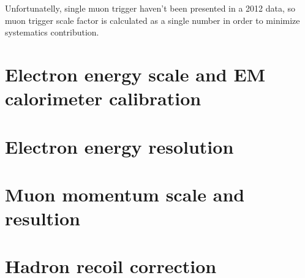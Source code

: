Unfortunatelly, single muon trigger haven't been presented in a 2012 data, so muon trigger scale factor is calculated as a single number in order to minimize systematics contribution. 
\section{Electron energy scale and EM calorimeter calibration}

\section{Electron energy resolution}
\section{Muon momentum scale and resultion}

\section{Hadron recoil correction}
